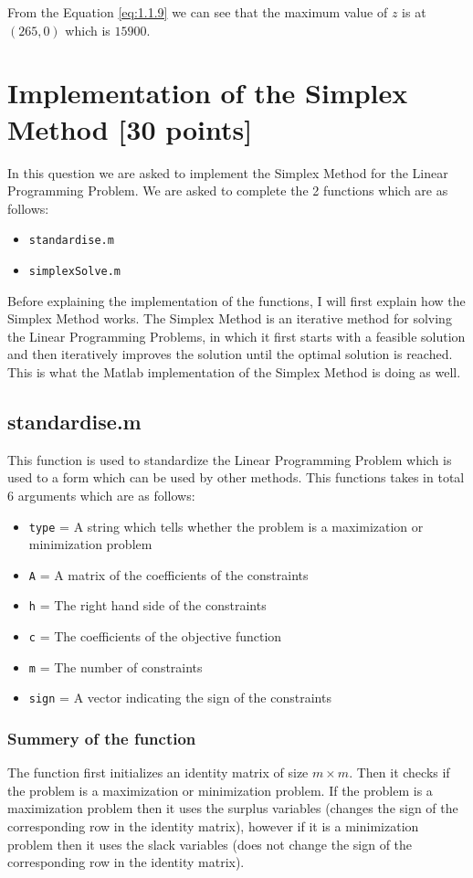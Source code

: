 \documentclass[unicode,11pt,a4paper,oneside,numbers=endperiod,openany]{scrartcl}
\begin{document}
From the Equation \ref{eq:1.1.9} we can see that the maximum value of $z$ is at $(265, 0)$ which is $15900$.

\section{Implementation of the Simplex Method [30 points]}
In this question we are asked to implement the Simplex Method for the Linear Programming Problem. We are asked to complete the 2 functions which are as follows:

\begin{itemize}
	\item \texttt{standardise.m}
	\item \texttt{simplexSolve.m}
\end{itemize}

Before explaining the implementation of the functions, I will first explain how the Simplex Method works. The Simplex Method is an iterative method for solving the Linear Programming Problems, in which it first starts with a feasible solution and then iteratively improves the solution until the optimal solution is reached. This is what the Matlab implementation of the Simplex Method is doing as well. 

\subsection{standardise.m}
This function is used to standardize the Linear Programming Problem which is used to a form which can be used by other methods. This functions takes in total 6 arguments which are as follows:

\begin{itemize}
	\item \texttt{type} = A string which tells whether the problem is a maximization or minimization problem
	\item \texttt{A} = A matrix of the coefficients of the constraints
	\item \texttt{h} = The right hand side of the constraints
	\item \texttt{c} = The coefficients of the objective function
	\item \texttt{m} = The number of constraints
	\item \texttt{sign} = A vector indicating the sign of the constraints
\end{itemize}

\subsubsection{Summery of the function}
The function first initializes an identity matrix of size $m \times m$. Then it checks if the problem is a maximization or minimization problem. If the problem is a maximization problem then it uses the surplus variables (changes the sign of the corresponding row in the identity matrix), however if it is a minimization problem then it uses the slack variables (does not change the sign of the corresponding row in the identity matrix).
\end{document}
